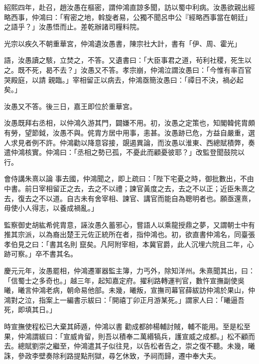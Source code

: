 \begin{pinyinscope}
 紹熙四年，赴召，趙汝愚在樞密，謂仲鴻直諒多聞，訪以蜀中利病。汝愚欲親出經略西事，仲鴻曰：「宥密之地，斡旋者易，公獨不聞呂申公『經略西事當在朝廷」之語乎？」汝愚悟而止。差乾辦諸司糧料院。



 光宗以疾久不朝重華宮，仲鴻遺汝愚書，陳宗社大計，書有「伊、周、霍光」



 語，汝愚讀之駭，立焚之，不答。又遺書曰：「大臣事君之道，茍利社稷，死生以之。既不死，曷不去？」汝愚又不答。孝宗崩，仲鴻泣謂汝愚曰：「今惟有率百官哭殿庭，以請
 親臨。」宰相留正以病去，仲鴻亟簡汝愚曰：「禫日不決，禍必起矣。」



 汝愚又不答。後三日，嘉王即位於重華宮。



 汝愚既拜右丞相，以仲鴻久游其門，闢嫌不用。初，汝愚之定策也，知閣韓侂胄頗有勞，望節鉞，汝愚不與。侂胄方居中用事，恚甚。汝愚跡已危，方益自嚴重，選人求見者例不許。仲鴻勸以降意容接，覬遏異論，而汝愚以淮東、西總賦積弊，奏遣仲鴻核實。仲鴻曰：「丞相之勢已孤，不憂此而顧憂彼耶？」改監登聞鼓院以行。



 會侍講朱熹以論
 事去國，仲鴻聞之，即上疏曰：「陛下宅憂之時，御批數出，不由中書。前日宰相留正之去，去之不以禮；諫官黃度之去，去之不以正；近臣朱熹之去，復去之不以道。自古未有舍宰相、諫官、講官而能自為聰明者也。願亟還熹，毋使小人得志，以養成禍亂。」



 監察御史胡紘希侂胄意，誣汝愚久蓄邪心，嘗語人以乘龍授鼎之夢，又謂朝士中有推其宗派，以為裔出楚王元佐正統所在者，指仲鴻也。初，欲直書仲鴻名，同臺張孝伯見之曰：「書其名則
 竄矣。凡阿附宰相，本冀官爵，此人沉埋六院且二年，心跡可察。」卒不書其名。



 慶元元年，汝愚罷相，仲鴻遷軍器監主簿，力丐外，除知洋州。朱熹聞其出，曰：「信蜀士之多奇也。」越三年，起知嘉定府。擢利路轉運判官，數忤宣撫副使吳曦，曦言仲鴻老病，朝命易他部。未幾，曦叛，宣撫司幕官薛紱訪仲鴻於果山，仲鴻對之泣，指案上一編書示紱曰：「開禧丁卯正月游某死。」謂家人曰：「曦逼吾死，即填其日。」



 時宣撫使程松已大棄其師遁，仲鴻以書
 勸成都帥楊輔討賊，輔不能用。至是松至果，仲鴻謂紱曰：「宣威肯留，則吾以積奉二萬緡犒兵，護宣威之成都。」松不顧而去。總賦劉崇之繼至，仲鴻遣其子似往見，以告松者告之，崇之復不聽。未幾，曦誅，參政李壁奏除利路提點刑獄，尋乞休致，予祠而歸，遷中奉大夫。




\end{pinyinscope}
